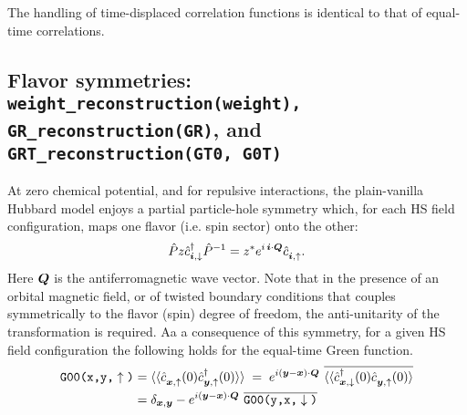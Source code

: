 The handling of time-displaced correlation functions is identical to that of equal-time correlations. 


\subsection[Flavor symmetries]{Flavor symmetries: \texttt{weight\_reconstruction(weight),  GR\_reconstruction(GR)}, and \texttt{GRT\_reconstruction(GT0, G0T)}}  \label{sec:flavor_symm_vanilla_hubbard}
At  zero  chemical  potential,  and  for  repulsive  interactions,    the plain-vanilla   Hubbard  model  enjoys a  partial  particle-hole  symmetry which, for  each HS  field  configuration,  maps one  flavor  (i.e.  spin  sector)  onto  the other:      
\begin{equation} 
	\hat{P}  z   \hat{c}^{\dagger}_{\ve{i},\downarrow} \hat{P}^{-1}    =  z^{*}  e^{i \,  \ve{i} \cdot \ve{Q} }\hat{c}^{\phantom\dagger}_{\ve{i},\uparrow}.
\end{equation}
Here  $ \boldsymbol{Q}$  is  the  antiferromagnetic wave  vector. 
Note  that   in the presence  of  an  orbital magnetic field, or  of   twisted boundary conditions  that  couples  symmetrically  to  the  flavor (spin)  
degree of  freedom,  
the anti-unitarity of the   transformation is   required.    Aa a   consequence  of  this    symmetry,  for  a  given  HS  field configuration the  following holds for  the  equal-time Green function. 
\begin{align}
\begin{aligned}
 \texttt{G00(x,y,}\uparrow\texttt{)}  &=     \langle \langle \hat{c}^{\phantom\dagger}_{\ve{x},\uparrow} (0)   \hat{c}^{\dagger}_{\ve{y},\uparrow} (0)   \rangle \rangle
 \;=\;   e^{i (\ve{y} - \ve{x}) \cdot \ve{Q}} \, \,  \overline{ \langle \langle \hat{c}^{\dagger}_{\ve{x},\downarrow} (0)  
     \hat{c}^{\phantom\dagger}_{\ve{y},\uparrow} (0)   \rangle }   
 \\      & =   \delta_{\ve{x},\ve{y}} -  e^{i (\ve{y} - \ve{x}) \cdot \ve{Q}}\, \, \overline{ \texttt{G00(y,x,}\downarrow\texttt{)}  } 
\end{aligned}
\end{align}

